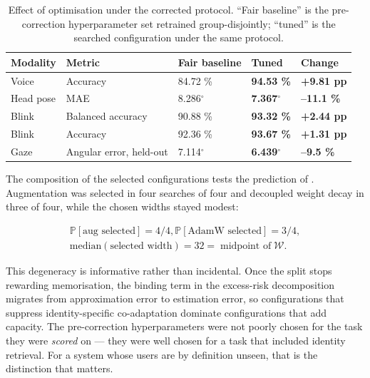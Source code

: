 \begin{table}[pos=htbp]
\centering
\caption{Effect of optimisation under the corrected protocol. ``Fair baseline'' is the pre-correction hyperparameter set retrained group-disjointly; ``tuned'' is the searched configuration under the same protocol.}
\label{tab:11}
\footnotesize
\begin{tabularx}{\textwidth}{XXXXX}
\toprule
\textbf{Modality} & \textbf{Metric} & \textbf{Fair baseline} & \textbf{Tuned} & \textbf{Change} \\
\midrule
Voice & Accuracy & 84.72 \% & \textbf{94.53 \%} & \textbf{+9.81 pp} \\
Head pose & MAE & 8.286$^{\circ}$ & \textbf{7.367$^{\circ}$} & \textbf{--11.1 \%} \\
Blink & Balanced accuracy & 90.88 \% & \textbf{93.32 \%} & \textbf{+2.44 pp} \\
Blink & Accuracy & 92.36 \% & \textbf{93.67 \%} & \textbf{+1.31 pp} \\
Gaze & Angular error, held-out & 7.114$^{\circ}$ & \textbf{6.439$^{\circ}$} & \textbf{--9.5 \%} \\
\bottomrule
\end{tabularx}
\end{table}

The composition of the selected configurations tests the prediction of . Augmentation was selected in four searches of four and decoupled weight decay in three of four, while the chosen widths stayed modest:

\begin{equation}
\label{eq:184}
\begin{aligned}
\mathbb{P}[ \text{aug selected} ] = 4/4 , \mathbb{P}[ \text{AdamW selected} ] = 3/4 , \\
\mathrm{median}( \text{selected width} ) = 32 = \;\text{midpoint of}\; \mathcal{W} .
\end{aligned}
\end{equation}

This degeneracy is informative rather than incidental. Once the split stops rewarding memorisation, the binding term in the excess-risk decomposition  migrates from approximation error to estimation error, so configurations that suppress identity-specific co-adaptation dominate configurations that add capacity. The pre-correction hyperparameters were not poorly chosen for the task they were \emph{scored} on --- they were well chosen for a task that included identity retrieval. For a system whose users are by definition unseen, that is the distinction that matters.

